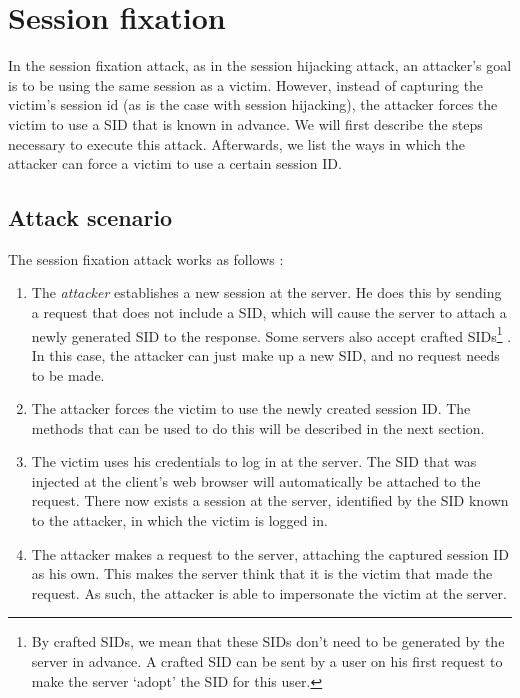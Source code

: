 \section{Session fixation}\label{fixation}

In the session fixation attack, as in the \gls{session hijacking} attack, an attacker's goal is to be using the same session as a victim. However, instead of capturing the victim's \gls{session id} (as is the case with session hijacking), the attacker forces the victim to use a SID that is known in advance. We will first describe the steps necessary to execute this attack. Afterwards, we list the ways in which the attacker can force a victim to use a certain session ID.

\subsection{Attack scenario}\label{fixation-scenario}

The session fixation attack works as follows \cite{Kolsek2002}:

\begin{enumerate}
	\item The \emph{attacker} establishes a new session at the server. He does this by sending a request that does not include a SID, which will cause the server to attach a newly generated
SID to the response. Some servers also accept crafted SIDs\footnote{By crafted SIDs, we mean that these SIDs don't need to be generated by the server in advance. A crafted SID can be sent by a user on his first request to make the server `adopt' the SID for this user.} \cite{Shiflett2004}. In this case, the attacker can just make up a new SID, and no request needs to be made.
	\item The attacker forces the victim to use the newly created session ID. The methods that can be used to do this will be described in the next section.
	\item The victim uses his credentials to log in at the server. The SID that was injected at the client's web browser will automatically be attached to the request. There now exists a session at the server, identified by the SID known to the attacker, in which the victim is logged in.
	\item The attacker makes a request to the server, attaching the captured session ID as his own. This makes the server think that it is the victim that made the request. As such, the attacker is able to impersonate the victim at the server.
\end{enumerate}


